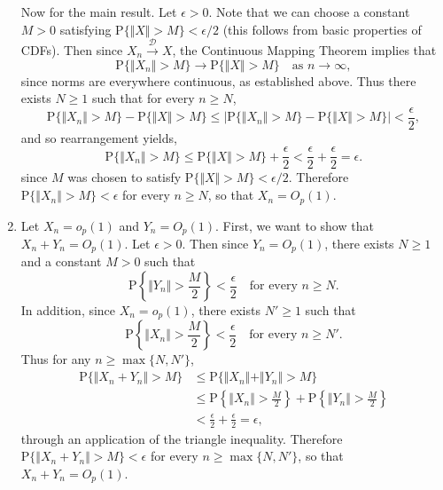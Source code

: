 \documentclass[12pt]{article}
\newcommand{\Prob}{\mathrm{P}}
\begin{document}
\begin{enumerate}
Now for the main result. Let $\epsilon > 0$. Note that we can choose a constant $M > 0$ satisfying $\Prob\{\Vert X \Vert > M\} < \epsilon / 2$ (this follows from basic properties of CDFs). Then since $X_n \overset{\mathcal{D}}\to X$, the Continuous Mapping Theorem implies that
\begin{equation*}
\Prob\{\Vert X_n \Vert > M\} \to \Prob\{\Vert X \Vert > M\} \quad \text{as $n \to \infty$},
\end{equation*}
since norms are everywhere continuous, as established above. Thus there exists $N \geq 1$ such that for every $n \geq N$,
\begin{equation*}
\Prob\{\Vert X_n \Vert > M\} - \Prob\{\Vert X \Vert > M\} \leq |\Prob\{\Vert X_n \Vert > M\} - \Prob\{\Vert X \Vert > M\}| < \frac{\epsilon}{2},
\end{equation*}
and so rearrangement yields,
\begin{equation*}
\Prob\{\Vert X_n \Vert > M\} \leq \Prob\{\Vert X \Vert > M\} + \frac{\epsilon}{2} < \frac{\epsilon}{2} + \frac{\epsilon}{2} = \epsilon.
\end{equation*}
since $M$ was chosen to satisfy $\Prob\{\Vert X \Vert > M\} < \epsilon / 2$. Therefore $\Prob\{\Vert X_n \Vert > M\} < \epsilon$ for every $n \geq N$, so that $X_n = O_p(1)$.

\item
Let $X_n = o_p(1)$ and $Y_n = O_p(1)$. First, we want to show that $X_n + Y_n = O_p(1)$. Let $\epsilon > 0$. Then since $Y_n = O_p(1)$, there exists $N \geq 1$ and a constant $M > 0$ such that
\begin{equation*}
\Prob\left\{\Vert Y_n \Vert > \frac{M}{2}\right\} < \frac{\epsilon}{2} \quad \text{for every $n \geq N$}.
\end{equation*}
In addition, since $X_n = o_p(1)$, there exists $N' \geq 1$ such that
\begin{equation*}
\Prob\left\{\Vert X_n \Vert > \frac{M}{2}\right\} < \frac{\epsilon}{2} \quad \text{for every $n \geq N'$}.
\end{equation*}
Thus for any $n \geq \max\{N, N'\}$,
\begin{align*}
\Prob\{\Vert X_n + Y_n \Vert > M\} &\leq \Prob\{\Vert X_n \Vert + \Vert Y_n \Vert > M\} \\
&\leq \Prob\left\{\Vert X_n \Vert > \frac{M}{2}\right\} + \Prob\left\{\Vert Y_n \Vert > \frac{M}{2}\right\} \\
&< \frac{\epsilon}{2} + \frac{\epsilon}{2} = \epsilon,
\end{align*}
through an application of the triangle inequality. Therefore $\Prob\{\Vert X_n + Y_n \Vert > M\} < \epsilon$ for every $n \geq \max\{N, N'\}$, so that $X_n + Y_n = O_p(1)$.


\end{enumerate}
\end{document}
